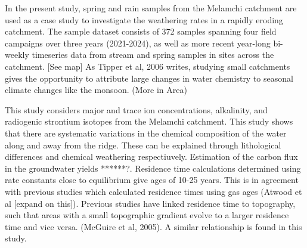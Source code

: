     \bsk



In the present study, spring and rain samples from the Melamchi catchment are used as a case 
study to investigate the weathering rates in a rapidly eroding catchment. The sample dataset consists of 372 samples spanning four field campaigns over three years (2021-2024), as well as more recent year-long bi-weekly timeseries data from stream and spring samples in sites across the catchment. [See map] 
As Tipper et al, 2006 writes, studying small catchments gives the opportunity to attribute large changes in water chemistry to seasonal climate changes like the monsoon. (More in Area)


 
\bsk

This study considers major and trace ion concentrations, alkalinity, and radiogenic strontium isotopes from the Melamchi catchment. This study shows that there are systematic variations in the chemical composition of the water along and away from the ridge. These can be explained through lithological differences and chemical weathering respectiuvely. Estimation of the carbon flux in the groundwater yields ******?. Residence time calculations determined using rate constants close to equilibrium give ages of 10-25 years. This is in agreement with previous studies which calculated residence times using gas ages (Atwood et al [expand on this]). Previous studies have linked residence time to topography, such that areas with a small topographic gradient evolve to a larger residence time and vice versa. (McGuire et al, 2005). A similar relationship is found in this study.
















